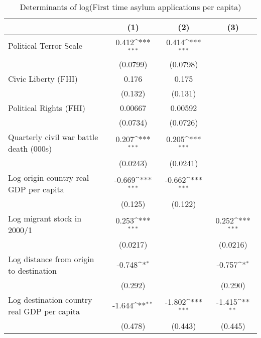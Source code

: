 \begin{table}[htbp]\centering
\def\sym#1{\ifmmode^{#1}\else\(^{#1}\)\fi}
\caption{Determinants of log(First time asylum applications per capita)}
\begin{tabular}{l*{3}{c}}
\hline\hline
                    &\multicolumn{1}{c}{(1)}         &\multicolumn{1}{c}{(2)}         &\multicolumn{1}{c}{(3)}         \\
\hline
Political Terror Scale&       0.412\sym{***}&       0.414\sym{***}&                     \\
                    &    (0.0799)         &    (0.0798)         &                     \\
[1em]
Civic Liberty (FHI) &       0.176         &       0.175         &                     \\
                    &     (0.132)         &     (0.131)         &                     \\
[1em]
Political Rights (FHI)&     0.00667         &     0.00592         &                     \\
                    &    (0.0734)         &    (0.0726)         &                     \\
[1em]
Quarterly civil war battle death (000s)&       0.207\sym{***}&       0.205\sym{***}&                     \\
                    &    (0.0243)         &    (0.0241)         &                     \\
[1em]
Log origin country real GDP per capita&      -0.669\sym{***}&      -0.662\sym{***}&                     \\
                    &     (0.125)         &     (0.122)         &                     \\
[1em]
Log migrant stock in 2000/1&       0.253\sym{***}&                     &       0.252\sym{***}\\
                    &    (0.0217)         &                     &    (0.0216)         \\
[1em]
Log distance from origin to destination&      -0.748\sym{*}  &                     &      -0.757\sym{*}  \\
                    &     (0.292)         &                     &     (0.290)         \\
[1em]
Log destination country real GDP per capita&      -1.644\sym{**} &      -1.802\sym{***}&      -1.415\sym{**} \\
                    &     (0.478)         &     (0.443)         &     (0.445)         \\

\end{tabular}
\end{table}
